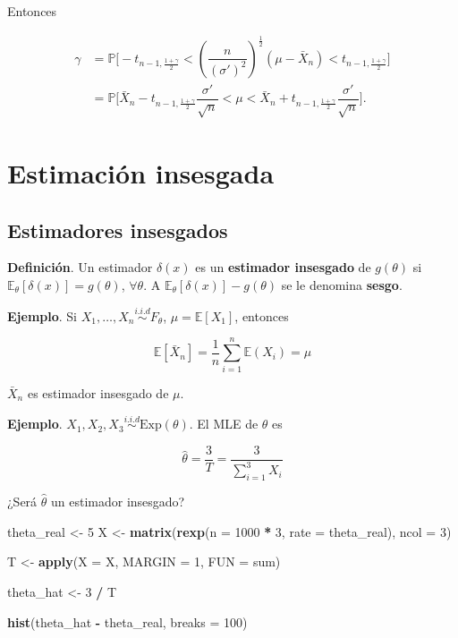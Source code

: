 \documentclass[
  12pt,
]{book}
\newenvironment{Shaded}{\begin{snugshade}}{\end{snugshade}}
\newcommand{\DataTypeTok}[1]{\textcolor[rgb]{0.13,0.29,0.53}{#1}}
\newcommand{\DecValTok}[1]{\textcolor[rgb]{0.00,0.00,0.81}{#1}}
\newcommand{\KeywordTok}[1]{\textcolor[rgb]{0.13,0.29,0.53}{\textbf{#1}}}
\newcommand{\NormalTok}[1]{#1}
\newcommand{\OperatorTok}[1]{\textcolor[rgb]{0.81,0.36,0.00}{\textbf{#1}}}
\newcommand{\StringTok}[1]{\textcolor[rgb]{0.31,0.60,0.02}{#1}}
\begin{document}
Entonces

\begin{align*}
\gamma & = \mathbb P\bigg[-t_{n-1,\frac{1+\gamma}{2}} < \left(\dfrac{n}{(\sigma')^2}\right)^{\frac 12}(\mu-\bar X_n)<t_{n-1,\frac{1+\gamma}{2}}\bigg] \\
& =  \mathbb P\bigg[\bar X_n-t_{n-1,\frac{1+\gamma}{2}}  \dfrac{\sigma'}{\sqrt n} < \mu < \bar X_n+t_{n-1,\frac{1+\gamma}{2}}  \dfrac{\sigma'}{\sqrt n}  \bigg].
\end{align*}

\hypertarget{estimaciuxf3n-insesgada}{%
\chapter{Estimación insesgada}\label{estimaciuxf3n-insesgada}}

\hypertarget{estimadores-insesgados}{%
\section{Estimadores insesgados}\label{estimadores-insesgados}}

\textbf{Definición}. Un estimador \(\delta(x)\) es un \textbf{estimador insesgado} de
\(g(\theta)\) si \(\mathbb E_{\theta}[\delta(x)] = g(\theta)\), \(\forall \theta\). A
\(\mathbb E_{\theta}[\delta(x)] - g(\theta)\) se le denomina \textbf{sesgo}.

\textbf{Ejemplo}. Si \(X_1,\dots, X_n \overset{i.i.d}{\sim} F_\theta\), \(\mu = \mathbb E[X_1]\), entonces

\[\mathbb E[\bar X_n] = \dfrac 1n \sum_{i=1}^n\mathbb E(X_i) = \mu\]

\(\bar X_n\) es estimador insesgado de \(\mu\).

\textbf{Ejemplo}. \(X_1,X_2,X_3 \overset{i.i.d}{\sim} \text{Exp}(\theta)\). El MLE de
\(\theta\) es

\[\hat\theta = \dfrac 3T = \dfrac 3{\sum_{i=1}^{3}X_i}\]

¿Será \(\hat\theta\) un estimador insesgado?

\begin{Shaded}
\begin{Highlighting}[]
\NormalTok{theta\_real \textless{}{-}}\StringTok{ }\DecValTok{5}
\NormalTok{X \textless{}{-}}\StringTok{ }\KeywordTok{matrix}\NormalTok{(}\KeywordTok{rexp}\NormalTok{(}\DataTypeTok{n =} \DecValTok{1000} \OperatorTok{*}\StringTok{ }\DecValTok{3}\NormalTok{, }\DataTypeTok{rate =}\NormalTok{ theta\_real), }\DataTypeTok{ncol =} \DecValTok{3}\NormalTok{)}

\NormalTok{T \textless{}{-}}\StringTok{ }\KeywordTok{apply}\NormalTok{(}\DataTypeTok{X =}\NormalTok{ X, }\DataTypeTok{MARGIN =} \DecValTok{1}\NormalTok{, }\DataTypeTok{FUN =}\NormalTok{ sum)}

\NormalTok{theta\_hat \textless{}{-}}\StringTok{ }\DecValTok{3} \OperatorTok{/}\StringTok{ }\NormalTok{T}

\KeywordTok{hist}\NormalTok{(theta\_hat }\OperatorTok{{-}}\StringTok{ }\NormalTok{theta\_real, }\DataTypeTok{breaks =} \DecValTok{100}\NormalTok{)}
\end{Highlighting}
\end{Shaded}
\end{document}
